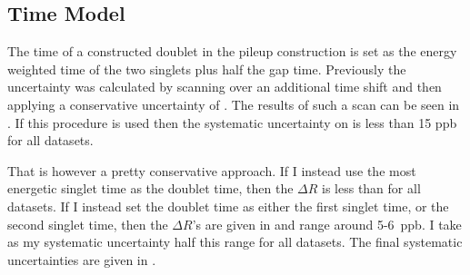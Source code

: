 \clearpage
\subsection{Time Model}

The time of a constructed doublet in the pileup construction is set as the energy weighted time of the two singlets plus half the gap time. Previously the uncertainty was calculated by scanning over an additional time shift and then applying a conservative uncertainty of . The results of such a scan can be seen in . If this procedure is used then the systematic uncertainty on \R is less than 15 ppb for all datasets.

That is however a pretty conservative approach. If I instead use the most energetic singlet time as the doublet time, then the $\Delta R$ is less than  for all datasets. If I instead set the doublet time as either the first singlet time, or the second singlet time, then the $\Delta R$'s are given in  and range around 5-6~ppb. I take as my systematic uncertainty half this range for all datasets. The final systematic uncertainties are given in .



